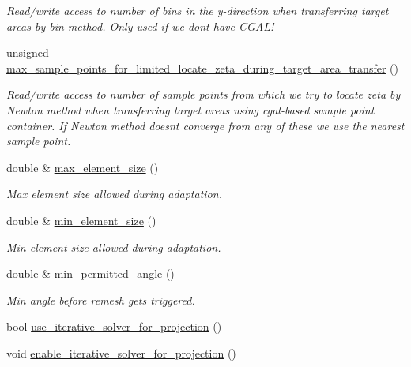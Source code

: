 \begin{DoxyCompactItemize}
\begin{DoxyCompactList}\small\item\em Read/write access to number of bins in the y-\/direction when transferring target areas by bin method. Only used if we don\textquotesingle{}t have C\+G\+A\+L! \end{DoxyCompactList}\item 
unsigned \hyperlink{classoomph_1_1RefineableTriangleMesh_a6ba54a6ea103236a3e5c31c2e8a11af9}{max\+\_\+sample\+\_\+points\+\_\+for\+\_\+limited\+\_\+locate\+\_\+zeta\+\_\+during\+\_\+target\+\_\+area\+\_\+transfer} ()
\begin{DoxyCompactList}\small\item\em Read/write access to number of sample points from which we try to locate zeta by Newton method when transferring target areas using cgal-\/based sample point container. If Newton method doesn\textquotesingle{}t converge from any of these we use the nearest sample point. \end{DoxyCompactList}\item 
double \& \hyperlink{classoomph_1_1RefineableTriangleMesh_a60fabb7d4e9389f827d6cfd332237c15}{max\+\_\+element\+\_\+size} ()
\begin{DoxyCompactList}\small\item\em Max element size allowed during adaptation. \end{DoxyCompactList}\item 
double \& \hyperlink{classoomph_1_1RefineableTriangleMesh_ad25cf23f688c1007b5fbbe41d2ec6cfc}{min\+\_\+element\+\_\+size} ()
\begin{DoxyCompactList}\small\item\em Min element size allowed during adaptation. \end{DoxyCompactList}\item 
double \& \hyperlink{classoomph_1_1RefineableTriangleMesh_a85f0515f33a727c75b80bfbbfe4b53f9}{min\+\_\+permitted\+\_\+angle} ()
\begin{DoxyCompactList}\small\item\em Min angle before remesh gets triggered. \end{DoxyCompactList}\item 
bool \hyperlink{classoomph_1_1RefineableTriangleMesh_ae2f0885e6e3fc4c0566986d9c8d2fe65}{use\+\_\+iterative\+\_\+solver\+\_\+for\+\_\+projection} ()
\item 
void \hyperlink{classoomph_1_1RefineableTriangleMesh_aa0e6f48ae67efc2931c03ca22eaa9ca0}{enable\+\_\+iterative\+\_\+solver\+\_\+for\+\_\+projection} ()

\end{DoxyCompactItemize}
